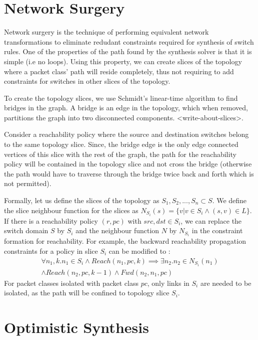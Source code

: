 \documentclass[]{sig}
\begin{document}
\section{Network Surgery}
Network surgery is the technique of performing equivalent network transformations to eliminate redudant constraints required for synthesis of switch rules. One of the properties of the path found by the synthesis solver is that it is simple (i.e no loops). Using this property, we can create slices of the topology where a packet class' path will reside completely, thus not requiring to add constraints for switches in other slices of the topology. 

To create the topology slices, we use Schmidt's linear-time algorithm\cite{schmidt} to find bridges in the graph. A bridge is an edge in the topology, which when removed, partitions the graph into two disconnected components. <write-about-slices>. 

Consider a reachability policy where the source and destination switches belong to the same topology slice. Since, the bridge edge is the only edge connected vertices of this slice with the rest of the graph, the path for the reachability policy will be contained in the topology slice and not cross the bridge (otherwise the path would have to traverse through the bridge twice back and forth which is not permitted). 

Formally, let us define the slices of the topology as $S_1, S_2, ..., S_n \subset S$. We define the slice neighbour function for the slices as $N_{S_i}(s) = \{v | v \in S_i \wedge (s,v) \in L\}$. If there is a reachability policy $(r, pc)$ with $src,dst \in S_i$, we can replace the switch domain $S$ by $S_i$ and the neighbour function $N$ by $N_{S_i}$ in the constraint formation for reachability. For example, the backward reachability propagation constraints for a policy in slice $S_i$ can be modified to : 
\begin{multline}
\forall n_1,k.  n_1 \in S_i \wedge Reach(n_1,pc,k) \implies \exists n_2. n_2 \in N_{S_i}(n_1) \\ \wedge  Reach(n_2,pc,k-1) \wedge Fwd(n_2,n_1,pc)
\end{multline}
For packet classes isolated with packet class $pc$, only links in $S_i$ are needed to be isolated, as the path will be confined to topology slice $S_i$. 

\section{Optimistic Synthesis} \label{sec:optimistic}
\end{document}
